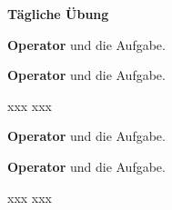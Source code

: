 \documentclass[a4paper, 12pt]{scrartcl}
\author{Marcel Lehmann}
\date{\today}
\title{}
\begin{document}
\begin{center}
 \large{\textbf{Tägliche Übung}}
\end{center}





\begin{aufgabe}[points = 3]
 \textbf{Operator} und die Aufgabe.
\end{aufgabe}


\begin{aufgabe}
 \textbf{Operator} und die Aufgabe.
 \begin{teilaufgaben}
  \teilaufgabe[2] xxx
  \teilaufgabe[3] xxx
 \end{teilaufgaben}
\end{aufgabe}

\begin{aufgabe}[points = 3]
 \textbf{Operator} und die Aufgabe.
\end{aufgabe}


\begin{aufgabe}
 \textbf{Operator} und die Aufgabe.
 \begin{teilaufgaben}
  \teilaufgabe[2] xxx
  \teilaufgabe[3] xxx
 \end{teilaufgaben}
\end{aufgabe}


\begin{center}
  \\
\end{center}

\punktuebersicht*
\end{document}
